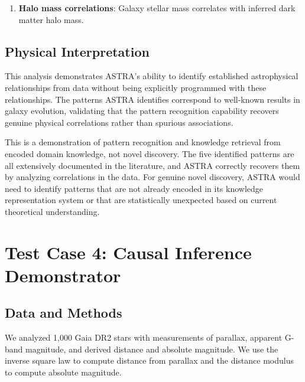 \documentclass[usenatbib]{rasti}
\begin{document}
\begin{enumerate}
\item \textbf{Halo mass correlations}: Galaxy stellar mass correlates with inferred dark matter halo mass.
\end{enumerate}

\subsection{Physical Interpretation}

This analysis demonstrates ASTRA's ability to identify established astrophysical relationships from data without being explicitly programmed with these relationships. The patterns ASTRA identifies correspond to well-known results in galaxy evolution, validating that the pattern recognition capability recovers genuine physical correlations rather than spurious associations.

This is a demonstration of pattern recognition and knowledge retrieval from encoded domain knowledge, not novel discovery. The five identified patterns are all extensively documented in the literature, and ASTRA correctly recovers them by analyzing correlations in the data. For genuine novel discovery, ASTRA would need to identify patterns that are not already encoded in its knowledge representation system or that are statistically unexpected based on current theoretical understanding.

\section{Test Case 4: Causal Inference Demonstrator}

\subsection{Data and Methods}

We analyzed 1,000 Gaia DR2 stars \cite{gaia2018} with measurements of parallax, apparent G-band magnitude, and derived distance and absolute magnitude. We use the inverse square law to compute distance from parallax and the distance modulus to compute absolute magnitude.
\end{document}
